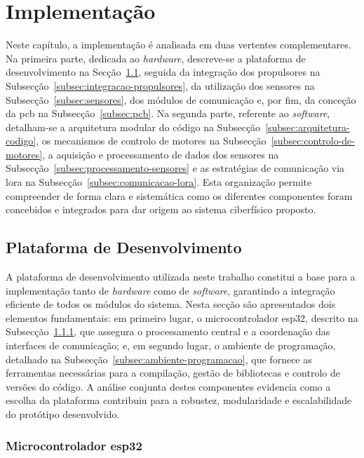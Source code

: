 
\chapter{Implementação}
\label{ch:implementacao}

Neste capítulo, a implementação é analisada em duas vertentes complementares.  
Na primeira parte, dedicada ao \emph{hardware}, descreve-se a plataforma de desenvolvimento na Secção~\ref{sec:plataforma-desenvolvimento}, seguida da integração dos propulsores na Subsecção~\ref{subsec:integracao-propulsores}, da utilização dos sensores na Subsecção~\ref{subsec:sensores}, dos módulos de comunicação e, por fim, da conceção da \gls{pcb} na Subsecção~\ref{subsec:pcb}. Na segunda parte, referente ao \emph{software}, detalham-se a arquitetura modular do código na Subsecção~\ref{subsec:arquitetura-codigo}, os mecanismos de controlo de motores na Subsecção~\ref{subsec:controlo-de-motores}, a aquisição e processamento de dados dos sensores na Subsecção~\ref{subsec:processamento-sensores} e as estratégias de comunicação via \gls{lora} na Subsecção~\ref{subsec:comunicacao-lora}. Esta organização permite compreender de forma clara e sistemática como os diferentes componentes foram concebidos e integrados para dar origem ao sistema ciberfísico proposto.

\section{Plataforma de Desenvolvimento}
\label{sec:plataforma-desenvolvimento}

A plataforma de desenvolvimento utilizada neste trabalho constitui a base para a implementação tanto de \emph{hardware} como de \emph{software}, garantindo a integração eficiente de todos os módulos do sistema. Nesta secção são apresentados dois elementos fundamentais: em primeiro lugar, o microcontrolador \gls{esp32}, descrito na Subsecção~\ref{subsec:esp32}, que assegura o processamento central e a coordenação das interfaces de comunicação; e, em segundo lugar, o ambiente de programação, detalhado na Subsecção~\ref{subsec:ambiente-programacao}, que fornece as ferramentas necessárias para a compilação, gestão de bibliotecas e controlo de versões do código. A análise conjunta destes componentes evidencia como a escolha da plataforma contribuiu para a robustez, modularidade e escalabilidade do protótipo desenvolvido.


\subsection{Microcontrolador \acrfull{esp32}}
\label{subsec:esp32}

